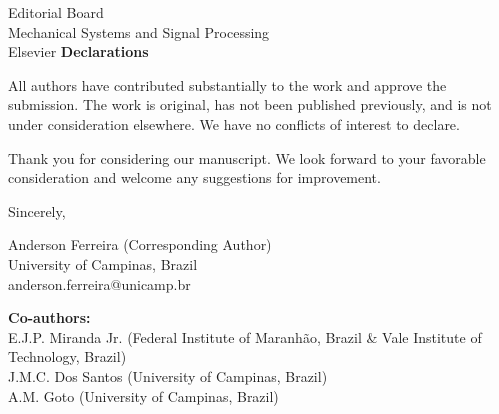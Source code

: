 \documentclass[11pt]{letter}
\begin{document}
\begin{letter}{Editorial Board\\
Mechanical Systems and Signal Processing\\
Elsevier}
\vspace{0.3cm}
\textbf{Declarations}

All authors have contributed substantially to the work and approve the submission. The work is original, has not been published previously, and is not under consideration elsewhere. We have no conflicts of interest to declare.

Thank you for considering our manuscript. We look forward to your favorable consideration and welcome any suggestions for improvement.

\closing{Sincerely,}

\vspace{1cm}
Anderson Ferreira (Corresponding Author)\\
University of Campinas, Brazil\\
anderson.ferreira@unicamp.br

\vspace{0.5cm}
\textbf{Co-authors:}\\
E.J.P. Miranda Jr. (Federal Institute of Maranhão, Brazil \& Vale Institute of Technology, Brazil)\\
J.M.C. Dos Santos (University of Campinas, Brazil)\\
A.M. Goto (University of Campinas, Brazil)

\end{letter}
\end{document}
